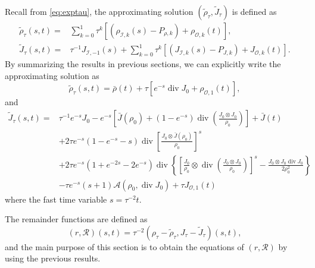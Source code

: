 \documentclass[english]{amsart}
\theoremstyle{plain}
\theoremstyle{definition}
\theoremstyle{remark}
\theoremstyle{plain}
\theoremstyle{plain}
\theoremstyle{plain}
\DeclareMathOperator{\diver}{div}
\numberwithin{equation}{section}
\begin{document}
Recall from \eqref{eq:exptau}, the approximating solution $(\tilde \rho_\tau,\tilde J_\tau)$ is defined as
\begin{equation}\label{eq:aprx}
\begin{aligned}
\tilde \rho_\tau(s,t)=&\sum_{k=0}^1 \tau^k\left[(\rho_{\mathcal{I},k}(s)-P_{\rho,k})+\rho_{\mathcal{O},k}(t)\right],\\
\tilde J_\tau(s,t)=&\tau^{-1}J_{\mathcal{I},-1}(s)+\sum_{k=0}^1 \tau^k\left[(J_{\mathcal{I},k}(s)-P_{J,k})+J_{\mathcal{O},k}(t)\right].
\end{aligned}
\end{equation}
By summarizing the results in previous sections, we can explicitly write the approximating solution as
\begin{equation}\label{eq:rho_aprx}
\tilde \rho_\tau(s,t)=\bar\rho(t)+\tau [e^{-s}\diver J_0+\rho_{\mathcal{O},1}(t)],
\end{equation}
and
\begin{equation}\label{eq:J_aprx}
\begin{aligned}
\tilde J_\tau(s,t)=&\tau^{-1}e^{-s}J_0-e^{-s}\left[\bar J(\rho_0)+(1-e^{-s})\diver\left(\frac{J_0\otimes J_0}{\rho_0}\right)\right]+\bar J(t)\\
&+2\tau e^{-s}(1-e^{-s}-s)\diver\left[\frac{J_0\otimes \bar J(\rho_0)}{\rho_0}\right]^s\\
&+2\tau e^{-s}(1+e^{-2s}-2e^{-s})\diver\left\{\left[\frac{J_0}{\rho_0}\otimes\diver\left(\frac{J_0\otimes J_0}{\rho_0}\right)\right]^s-\frac{J_0\otimes J_0\diver J_0}{2\rho_0^2}\right\}\\
&-\tau e^{-s}(s+1)\mathcal{A}(\rho_0,\diver J_0)+\tau J_{\mathcal{O},1}(t)
\end{aligned}
\end{equation}
where the fast time variable $s=\tau^{-2}t$. 

The remainder functions are defined as
\begin{equation}\label{eq:r_1}
(r,\mathcal{R})(s,t)=\tau^{-2}(\rho_\tau-\tilde \rho_\tau,J_\tau-\tilde J_\tau)(s,t),
\end{equation}
and the main purpose of this section is to obtain the equations of $(r,\mathcal{R})$ by using the previous results. 
\end{document}
